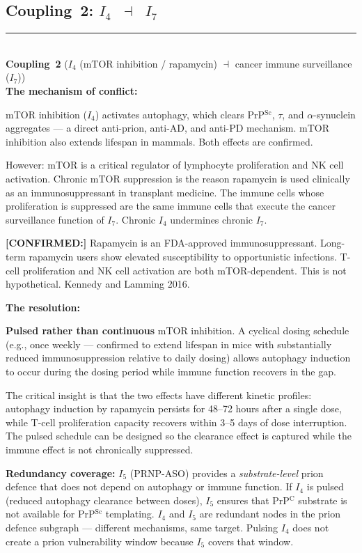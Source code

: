 \documentclass[12pt,a4paper]{article}
\newcommand{\prpc}{PrP$^{\mathrm{C}}$}
\newcommand{\prpsc}{PrP$^{\mathrm{Sc}}$}
\newcommand{\confirmed}[1]{\noindent\colorbox{green!10}{\parbox{\dimexpr\linewidth-2\fboxsep}{%
  \textbf{[CONFIRMED:]} #1}}\vspace{0.4em}}
\newcommand{\Inet}[1]{$I_{#1}$}
\newcommand{\coupling}[2]{\medskip\noindent\rule{\linewidth}{0.4pt}\\
  \textbf{Coupling~#1} (#2)\\[0.3em]}
\begin{document}
\subsection{Coupling~2: \texorpdfstring{\Inet{4}~$\dashv$~\Inet{7}}{I4 -| I7}}

\coupling{2}{\Inet{4} (mTOR inhibition / rapamycin) $\dashv$ cancer immune
surveillance (\Inet{7})}

\textbf{The mechanism of conflict:}

mTOR inhibition (\Inet{4}) activates autophagy, which clears \prpsc{},
$\tau$, and $\alpha$-synuclein aggregates --- a direct anti-prion, anti-AD,
and anti-PD mechanism. mTOR inhibition also extends lifespan in mammals.
Both effects are confirmed.

However: mTOR is a critical regulator of lymphocyte proliferation and NK
cell activation. Chronic mTOR suppression is the reason rapamycin is used
clinically as an immunosuppressant in transplant medicine. The immune cells
whose proliferation is suppressed are the same immune cells that execute the
cancer surveillance function of \Inet{7}. Chronic \Inet{4} undermines chronic
\Inet{7}.

\confirmed{Rapamycin is an FDA-approved immunosuppressant. Long-term rapamycin
users show elevated susceptibility to opportunistic infections. T-cell
proliferation and NK cell activation are both mTOR-dependent. This is not
hypothetical. Kennedy and Lamming 2016.}

\textbf{The resolution:}

\textbf{Pulsed rather than continuous} mTOR inhibition. A cyclical dosing
schedule (e.g., once weekly --- confirmed to extend lifespan in mice with
substantially reduced immunosuppression relative to daily dosing) allows
autophagy induction to occur during the dosing period while immune function
recovers in the gap.

The critical insight is that the two effects have different kinetic profiles:
autophagy induction by rapamycin persists for 48--72 hours after a single
dose, while T-cell proliferation capacity recovers within 3--5 days of
dose interruption. The pulsed schedule can be designed so the clearance
effect is captured while the immune effect is not chronically suppressed.

\textbf{Redundancy coverage:} \Inet{5} (PRNP-ASO) provides a
\textit{substrate-level} prion defence that does not depend on autophagy or
immune function. If \Inet{4} is pulsed (reduced autophagy clearance between
doses), \Inet{5} ensures that \prpc{} substrate is not available for
\prpsc{} templating. \Inet{4} and \Inet{5} are redundant nodes in the prion
defence subgraph --- different mechanisms, same target. Pulsing \Inet{4} does
not create a prion vulnerability window because \Inet{5} covers that window.
\end{document}
